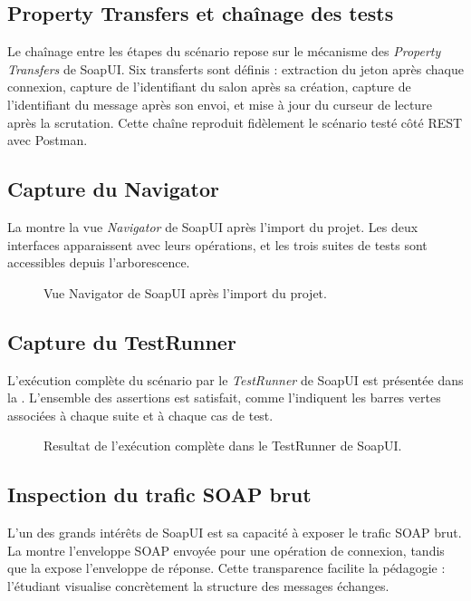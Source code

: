 \subsection{Property Transfers et chaînage des tests}

Le chaînage entre les étapes du scénario repose sur le mécanisme des \emph{Property Transfers} de SoapUI. Six transferts sont définis : extraction du jeton après chaque connexion, capture de l'identifiant du salon après sa création, capture de l'identifiant du message après son envoi, et mise à jour du curseur de lecture après la scrutation. Cette chaîne reproduit fidèlement le scénario testé côté REST avec Postman.

\subsection{Capture du Navigator}

La  montre la vue \emph{Navigator} de SoapUI après l'import du projet. Les deux interfaces apparaissent avec leurs opérations, et les trois suites de tests sont accessibles depuis l'arborescence.

\begin{figure}[ht]
  \centering
  \fbox{\rule{0pt}{8cm}\rule{12cm}{0pt}}
  \caption{Vue Navigator de SoapUI après l'import du projet.}
  \label{fig:soapui-navigator}
\end{figure}

\subsection{Capture du TestRunner}

L'exécution complète du scénario par le \emph{TestRunner} de SoapUI est présentée dans la . L'ensemble des assertions est satisfait, comme l'indiquent les barres vertes associées à chaque suite et à chaque cas de test.

\begin{figure}[ht]
  \centering
  \fbox{\rule{0pt}{8cm}\rule{12cm}{0pt}}
  \caption{Resultat de l'exécution complète dans le TestRunner de SoapUI.}
  \label{fig:soapui-runner}
\end{figure}

\subsection{Inspection du trafic SOAP brut}

L'un des grands intérêts de SoapUI est sa capacité à exposer le trafic SOAP brut. La  montre l'enveloppe SOAP envoyée pour une opération de connexion, tandis que la  expose l'enveloppe de réponse. Cette transparence facilite la pédagogie : l'étudiant visualise concrètement la structure des messages échanges.

